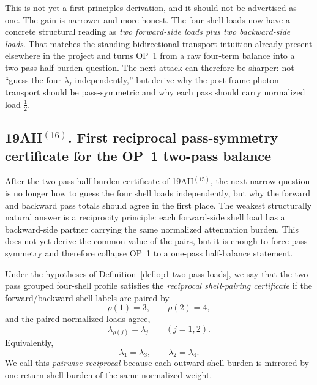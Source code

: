 \begin{remark}
This is not yet a first-principles derivation, and it should not be advertised as one. The gain is narrower and more honest. The four shell loads now have a concrete structural reading as \emph{two forward-side loads plus two backward-side loads}. That matches the standing bidirectional transport intuition already present elsewhere in the project and turns OP~1 from a raw four-term balance into a two-pass half-burden question. The next attack can therefore be sharper: not ``guess the four \(\lambda_j\) independently,'' but derive why the post-frame photon transport should be pass-symmetric and why each pass should carry normalized load \(\tfrac12\).
\end{remark}


\subsection*{19AH$^{(16)}$. First reciprocal pass-symmetry certificate for the OP~1 two-pass balance}
After the two-pass half-burden certificate of 19AH$^{(15)}$, the next narrow question is no longer how to guess the four shell loads independently, but why the forward and backward pass totals should agree in the first place. The weakest structurally natural answer is a reciprocity principle: each forward-side shell load has a backward-side partner carrying the same normalized attenuation burden. This does not yet derive the common value of the pairs, but it is enough to force pass symmetry and therefore collapse OP~1 to a one-pass half-balance statement.

\begin{definition}
\label{def:op1-reciprocal-shell-pairing}
Under the hypotheses of Definition~\ref{def:op1-two-pass-loads}, we say that the two-pass grouped four-shell profile satisfies the \emph{reciprocal shell-pairing certificate} if the forward/backward shell labels are paired by
\[
  \rho(1)=3,\qquad \rho(2)=4,
\]
and the paired normalized loads agree,
\[
  \lambda_{\rho(j)}=\lambda_j\qquad (j=1,2).
\]
Equivalently,
\[
  \lambda_1=\lambda_3,
  \qquad
  \lambda_2=\lambda_4.
\]
We call this \emph{pairwise reciprocal} because each outward shell burden is mirrored by one return-shell burden of the same normalized weight.
\end{definition}

